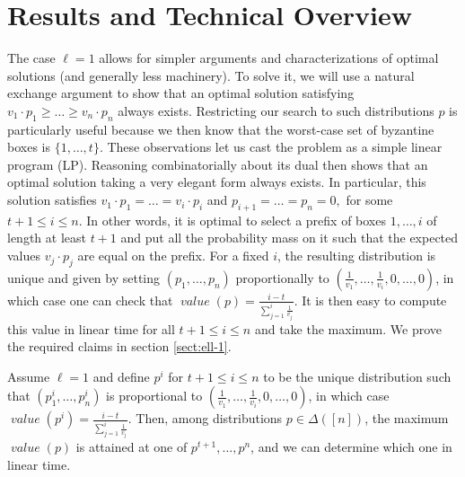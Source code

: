 \documentclass[sigconf,nonacm]{aamas}
\DeclareMathOperator{\valueText}{\textit{value}}
\newcommand{\val}[1]{\valueText({#1})}
\begin{document}
\section{Results and Technical Overview}\label{sect:technical-overview}
The case $\ell = 1$ allows for simpler arguments and characterizations of optimal solutions (and generally less machinery). To solve it, we will use a natural exchange argument to show that an optimal solution satisfying $v_1 \cdot p_1 \geq \dots \geq v_n \cdot p_n$ always exists. Restricting our search to such distributions $p$ is particularly useful because we then know that the worst-case set of byzantine boxes is $\{1, \dots, t\}.$
These observations let us cast the problem as a simple linear program (LP). 
Reasoning combinatorially about its dual then shows that an optimal solution taking a very elegant form always exists. In particular, this solution satisfies $v_1\cdot p_1 = \dots 
= v_i\cdot p_i$ and $p_{i + 1} = \dots = p_n = 0,$ for some $t + 1 \leq i \leq n.$ In other words, it is optimal to select a prefix of boxes $1, \dots, i$ of length at least $t + 1$ and put all the probability mass on it such that the expected values $v_j \cdot p_j$ are equal on the prefix. For a fixed $i$, the resulting distribution is unique and given by setting $\left(p_1, \dots, p_n\right)$ proportionally to $\left(\frac{1}{v_1}, \dots, \frac{1}{v_i}, 0, \dots, 0\right)$, in which case one can check that $\val{p} = \frac{i - t}{\sum_{j = 1}^i \frac{1}{v_j}}$. It is then easy to compute this value in linear time for all $t + 1 \leq i \leq n$ and take the maximum. We prove the required claims in section \cref{sect:ell-1}.

\begin{theorem}\label{th:main:ell-one} Assume $\ell = 1$ and define $p^i$ for $t + 1 \leq i \leq n$ to be the unique distribution such that $\left(p^i_1, \dots, p^i_n\right)$ is proportional to $\left(\frac{1}{v_1}, \dots, \frac{1}{v_i}, 0, \dots, 0\right)$, in which case $\val{p^i} = \frac{i - t}{\sum_{j = 1}^i \frac{1}{v_j}}$. Then, among distributions $p \in \Delta([n])$, the maximum $\val{p}$ is attained at one of $p^{t + 1}, \dots, p^n$, and we can determine which one in linear time.
\end{theorem}
\end{document}
